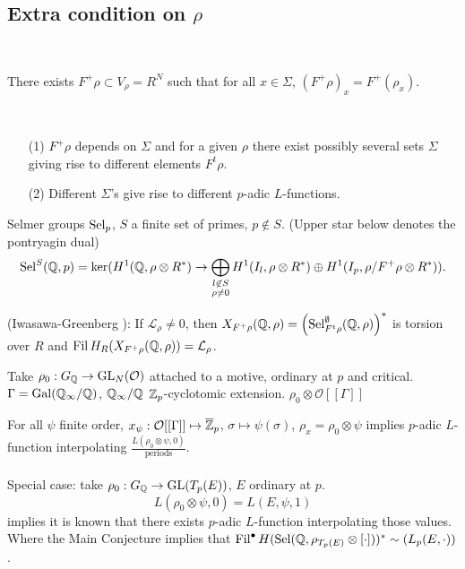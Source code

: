 \documentclass[12pt,amsfont]{amsart}
\begin{document}
\subsection{Extra condition on $\rho$}
{\ }

There exists $F^+ \rho \subset V_\rho = R^N$ such that for all $x \in \Sigma$, $(F^+ \rho)_x = F^+(\rho_x)$. 
\begin{rmk} 
{\ }
\begin{enumerate}
\item[(1)] 
$F^+ \rho$ depends on $\Sigma$ and for a given $\rho$ there exist possibly several sets $\Sigma$ giving rise to different elements $F^t \rho$.
\item[(2)]
Different $\Sigma$'s give rise to different $p$-adic $L$-functions. 
\end{enumerate}
\end{rmk}
Selmer groups $\operatorname{Sel}_p$, $S$ a finite set of primes, $p \not \in S$. (Upper star below denotes the pontryagin dual)
$$\displaystyle \operatorname{Sel}^S({\mathbb Q}, p) = \ker(H^1({\mathbb Q}, \rho \otimes R^\ast) \rightarrow \bigoplus_{\substack{l \not \in S\\ \rho \ne 0}} H^1(I_l,\rho \otimes R^\ast) \oplus H^1(I_p, \rho/F^+ \rho \otimes R^\ast)).$$
\begin{cnj} (Iwasawa-Greenberg ): If $\mathcal{L}_\rho \ne 0$, then $X_{F^+ \rho}({\mathbb Q}, \rho) = \left(\operatorname{Sel}_{F^t \rho}^{\emptyset} ({\mathbb Q}, \rho)\right)^\ast$ is torsion over $R$ and $\operatorname{Fil} H_R (X_{F^+ \rho} ({\mathbb Q}, \rho)) = \mathcal{L}_\rho$. 
\end{cnj}
\begin{xmp} Take $\rho_0 : G_{\mathbb Q} \rightarrow \operatorname{GL}_N(\mathcal{O})$ attached to a motive, ordinary at $p$ and critical. $\Gamma = \operatorname{Gal}({\mathbb Q}_\infty / {\mathbb Q})$, ${\mathbb Q}_\infty/{\mathbb Q}$ ${\mathbb Z}_p$-cyclotomic extension. $\rho_0 \otimes \mathcal{O} [[\Gamma ]]$

For all $\psi$ finite order, $x_\psi : \mathcal{O}[[\Gamma]] \mapsto \overline{{\mathbb Z}}_p$, $\sigma \mapsto \psi(\sigma)$, $\rho_x = \rho_0 \otimes \psi$ implies $p$-adic $L$-function interpolating $\displaystyle \frac{L(\rho_0 \otimes \psi, 0)}{\text{periods}}$. \\ \\
Special case: take $\rho_0 : G_{\mathbb Q} \rightarrow \operatorname{GL}(T_p(E))$, $E$ ordinary at $p$. 
$$\displaystyle L(\rho_0 \otimes \psi, 0) = L(E, \psi, 1)$$
implies it is known that there exists $p$-adic $L$-function interpolating those values.  Where the Main Conjecture implies that $\operatorname{Fil}^\bullet H(\operatorname{Sel}({\mathbb Q}, \rho_{T_p(E)} \otimes [ \cdot ]))^\ast \sim (L_p(E, \cdot))$. 
\end{xmp}
\end{document}
